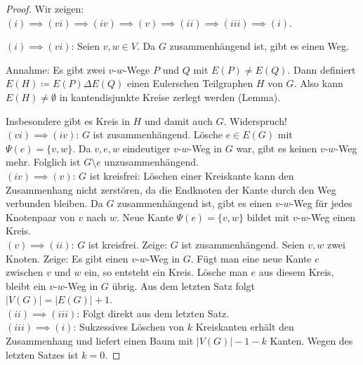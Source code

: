 \documentclass[a4paper,12pt]{article}
\theoremstyle{definition}
\begin{document}
	\begin{proof}
		Wir zeigen: $(i) \implies (vi) \implies (iv) \implies (v) \implies (ii) \implies (iii) \implies (i)$.
		
		$(i) \implies (vi)$: Seien $v, w \in V$. Da $G$ zusammenhängend ist, gibt es einen Weg. 
		
		Annahme: Es gibt zwei $v$-$w$-Wege $P$ und $Q$ mit $E(P) \neq E(Q)$. Dann definiert $E(H) \coloneq E(P) \Delta E(Q)$ einen Eulerschen Teilgraphen $H$ von $G$. Also kann $E(H) \neq \emptyset$ in kantendisjunkte Kreise zerlegt werden (Lemma).
		
		Insbesondere gibt es Kreis in $H$ und damit auch $G$. Widerspruch!\\[2ex]
		$(vi) \implies (iv)$: $G$ ist zusammenhängend. Lösche $e \in E(G)$ mit $\Psi(e) = \{v, w\}$. Da $v, e, w$ eindeutiger $v$-$w$-Weg in $G$ war, gibt es keinen $v$-$w$-Weg mehr. Folglich ist $G \setminus e$ unzusammenhängend.\\[2ex]
		$(iv) \implies (v)$: $G$ ist kreisfrei: Löschen einer Kreiskante kann den Zusammenhang nicht zerstören, da die Endknoten der Kante durch den Weg verbunden bleiben. Da $G$ zusammenhängend ist, gibt es einen $v$-$w$-Weg für jedes Knotenpaar von $v$ nach $w$. Neue Kante $\Psi(e) = \{v, w\}$ bildet mit $v$-$w$-Weg einen Kreis.\\[2ex]
		$(v) \implies (ii)$: $G$ ist kreisfrei. Zeige: $G$ ist zusammenhängend. Seien $v, w$ zwei Knoten. Zeige: Es gibt einen $v$-$w$-Weg in $G$. Fügt man eine neue Kante $e$ zwischen $v$ und $w$ ein, so entsteht ein Kreis. Lösche man $e$ aus diesem Kreis, bleibt ein $v$-$w$-Weg in $G$ übrig. Aus dem letzten Satz folgt $\lvert V(G) \rvert = \lvert E(G)\rvert + 1$.\\[2ex]
		$(ii) \implies (iii)$: Folgt direkt aus dem letzten Satz.\\[2ex]
		$(iii) \implies (i)$: Sukzessives Löschen von $k$ Kreiskanten erhält den Zusammenhang und liefert einen Baum mit $\lvert V(G)\rvert - 1 - k$ Kanten. Wegen des letzten Satzes ist $k = 0$.
	\end{proof}
\end{document}
